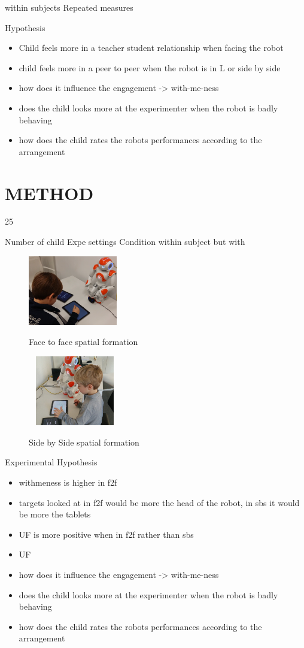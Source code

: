 \documentclass[letterpaper, 10 pt, conference]{ieeeconf}  %
\begin{document}
within subjects Repeated measures 


Hypothesis
\begin{itemize}
\item Child feels more in a teacher student relationship when facing the robot
\item child feels more in a peer to peer when the robot is in L or side by side 
\item how does it influence the engagement -> with-me-ness
\item  does the child looks more at the experimenter when the robot is badly behaving
\item how does the child rates the robots performances according to  the arrangement
\end{itemize}


\section{METHOD}
25

Number of child
Expe settings
Condition within subject but with 
\begin{figure}[t!]
    \centering
        \includegraphics[height=1.2in]{./figures/f2f_photo.png}
        \caption{Face to face spatial formation}
   ~
        \includegraphics[height=1.2in]{./figures/s2s_photo2.jpg}
        \caption{Side by Side spatial formation}
\end{figure}

Experimental Hypothesis
\begin{itemize}
\item withmeness is higher in f2f
\item targets looked at in f2f would be more the head of the robot, in sbs it would be more the tablets
\item UF is more positive when in f2f rather than sbs
\item UF 
\item how does it influence the engagement -> with-me-ness
\item  does the child looks more at the experimenter when the robot is badly behaving
\item how does the child rates the robots performances according to  the arrangement
\end{itemize}
\end{document}
